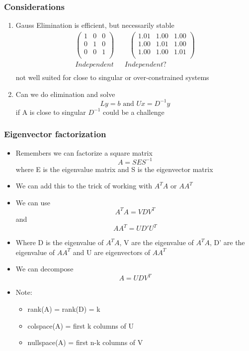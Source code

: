 \documentclass[10pt]{beamer}
\begin{document}
\begin{frame}
  \frametitle{Considerations}
  \begin{enumerate}
  \item Gauss Elimination is efficient, but necessarily stable
    \[
      \begin{array}{cc}
        \left(
        \begin{array}{ccc}
          1& 0 & 0 \\
          0& 1 & 0 \\
          0 & 0 & 1\\ 
        \end{array}\right) 
        ~~~ & ~~~\left(
        \begin{array}{ccc}
          1.01 & 1.00 & 1.00 \\
          1.00 & 1.01 & 1.00 \\
          1.00 & 1.00 & 1.01 \\ 
        \end{array}\right) \\
        Independent & Independent? \\
      \end{array}
    \]
    not well suited for close to singular or over-constrained systems
  \item Can we do elimination and solve
    \[
      L y = b \mbox{ and } U x = D^{-1} y
    \]
    if A is close to singular $D^{-1}$ could be a challenge
  \end{enumerate}  
\end{frame}

\begin{frame}
  \frametitle{Eigenvector factorization}
  \begin{itemize}
  \item Remembers we can factorize a square matrix
    \[ A = SES^{-1} \]
    where E is the eigenvalue matrix and S is the eigenvector matrix
  \item We can add this to the trick of working with $A^T A$ or $AA^T$ 
  \item We can use
    \[
      A^T A = V D V^T
    \]
    and
    \[
      A A^T = U D' U^T
    \]
    
  \item Where D is the eigenvalue of $A^T A$, V are the eigenvalue of
    $A^T A$, D' are the eigenvalue of $AA^T$ and U are eigenvectors of
    $AA^T$
  \item We can decompose
    \[
      A = U D V^T
    \]
  \item Note:
    \begin{itemize}
    \item rank(A) = rank(D) = k
    \item colspace(A) = first k columns of U
    \item nullspace(A) = first n-k columns of V
    \end{itemize}
  \end{itemize}
\end{frame}
\end{document}
